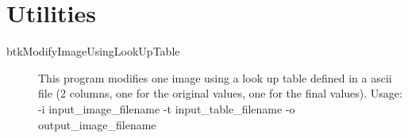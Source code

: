 \section{Utilities}


\begin{description}
 \item[btkModifyImageUsingLookUpTable] This program modifies one image using a look up table defined in a ascii file (2 columns, one for the original values, one for the final values). Usage: -i input_image_filename -t input_table_filename -o output_image_filename
\end{description}
